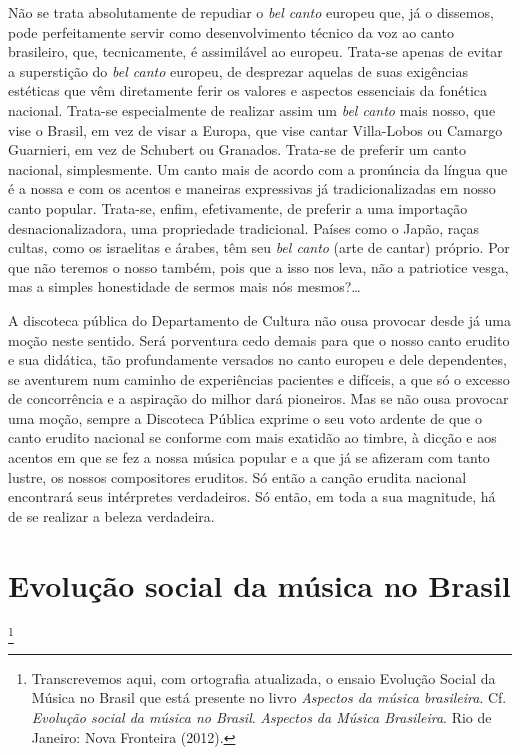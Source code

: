 Não se trata absolutamente de repudiar o \textit{bel canto} europeu que, já o
dissemos, pode perfeitamente servir como desenvolvimento técnico da voz
ao canto brasileiro, que, tecnicamente, é assimilável ao europeu.
Trata-se apenas de evitar a superstição do \textit{bel canto} europeu, de
desprezar aquelas de suas exigências estéticas que vêm diretamente ferir
os valores e aspectos essenciais da fonética nacional. Trata-se
especialmente de realizar assim um \textit{bel canto} mais nosso, que vise o
Brasil, em vez de visar a Europa, que vise cantar Villa-Lobos ou Camargo
Guarnieri, em vez de Schubert ou Granados. Trata-se de preferir um canto
nacional, simplesmente. Um canto mais de acordo com a pronúncia da
língua que é a nossa e com os acentos e maneiras expressivas já
tradicionalizadas em nosso canto popular. Trata-se, enfim, efetivamente,
de preferir a uma importação desnacionalizadora, uma propriedade
tradicional. Países como o Japão, raças cultas, como os israelitas e
árabes, têm seu \textit{bel canto} (arte de cantar) próprio. Por que não teremos
o nosso também, pois que a isso nos leva, não a patriotice vesga, mas a
simples honestidade de sermos mais nós mesmos?\ldots{}

A discoteca pública do Departamento de Cultura não ousa provocar desde
já uma moção neste sentido. Será porventura cedo demais para que o nosso
canto erudito e sua didática, tão profundamente versados no canto
europeu e dele dependentes, se aventurem num caminho de experiências
pacientes e difíceis, a que só o excesso de concorrência e a aspiração
do milhor dará pioneiros. Mas se não ousa provocar uma moção, sempre a
Discoteca Pública exprime o seu voto ardente de que o canto erudito
nacional se conforme com mais exatidão ao timbre, à dicção e aos acentos
em que se fez a nossa música popular e a que já se afizeram com tanto
lustre, os nossos compositores eruditos. Só então a canção erudita
nacional encontrará seus intérpretes verdadeiros. Só então, em toda a
sua magnitude, há de se realizar a beleza verdadeira.


\chapter{Evolução social da música no Brasil}\footnote{Transcrevemos aqui, com ortografia atualizada, o ensaio Evolução Social da Música no Brasil que está presente no livro \textit{Aspectos da música brasileira}. Cf. \textit{Evolução social da música no Brasil}. \textit{Aspectos da Música Brasileira}. Rio de Janeiro: Nova Fronteira (2012).}

